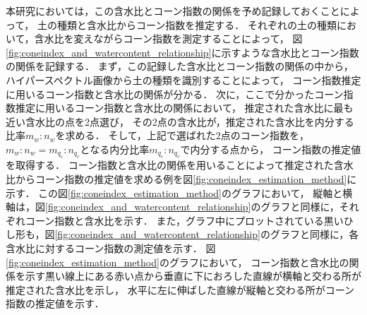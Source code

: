 本研究においては，この含水比とコーン指数の関係を予め記録しておくことによって，
土の種類と含水比からコーン指数を推定する．
それぞれの土の種類において，含水比を変えながらコーン指数を測定することによって，
図\ref{fig:coneindex_and_watercontent_relationship}に示すような含水比とコーン指数の関係を記録する．
まず，この記録した含水比とコーン指数の関係の中から，ハイパースペクトル画像から土の種類を識別することによって，
コーン指数推定に用いるコーン指数と含水比の関係が分かる．
次に，ここで分かったコーン指数推定に用いるコーン指数と含水比の関係において，
推定された含水比に最も近い含水比の点を2点選び，
その2点の含水比が，推定された含水比を内分する比率$m_w:n_w$を求める．
そして，上記で選ばれた2点のコーン指数を，$m_w:n_w = m_{q_c}:n_{q_c}$となる内分比率$m_{q_c}:n_{q_c}$で内分する点から，
コーン指数の推定値を取得する．
コーン指数と含水比の関係を用いることによって推定された含水比からコーン指数の推定値を求める例を図\ref{fig:coneindex_estimation_method}に示す．
この図\ref{fig:coneindex_estimation_method}のグラフにおいて，
縦軸と横軸は，図\ref{fig:coneindex_and_watercontent_relationship}のグラフと同様に，それぞれコーン指数と含水比を示す．
また，グラフ中にプロットされている黒いひし形も，図\ref{fig:coneindex_and_watercontent_relationship}のグラフと同様に，各含水比に対するコーン指数の測定値を示す．
図\ref{fig:coneindex_estimation_method}のグラフにおいて，
コーン指数と含水比の関係を示す黒い線上にある赤い点から垂直に下におろした直線が横軸と交わる所が推定された含水比を示し，
水平に左に伸ばした直線が縦軸と交わる所がコーン指数の推定値を示す．

